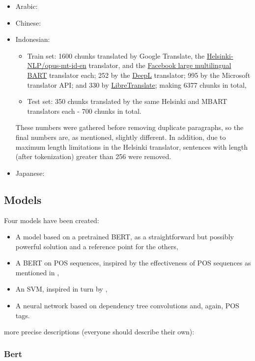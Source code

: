 \documentclass[twocolumn]{article}
\begin{document}
\begin{itemize}
	\item Arabic:
	\item Chinese:
	\item Indonesian:
	\begin{itemize}
		\item Train set: 1600 chunks translated by Google Translate, the \href{https://huggingface.co/Helsinki-NLP/opus-mt-id-en}{Helsinki-NLP/opus-mt-id-en} translator, and the \href{https://huggingface.co/facebook/mbart-large-50-many-to-one-mmt}{Facebook large multilingual BART} translator each; 252 by the \href{https://www.deepl.com/en/translator}{DeepL} translator; 995  by the Microsoft translator API; and 330 by \href{https://libretranslate.com/}{LibreTranslate}; making 6377 chunks in total,
		\item Test set: 350 chunks translated by the same Helsinki and MBART translators each - 700 chunks in total.
	\end{itemize}
	These numbers were gathered before removing duplicate paragraphs, so the final numbers are, as mentioned, slightly different. In addition, due to maximum length limitations in the Helsinki translator, sentences with length (after tokenization) greater than 256 were removed.

	\item Japanese:
\end{itemize}

\subsection*{Models}

Four models have been created:

\begin{itemize}
	\item A model based on a pretrained BERT, as a straightforward but possibly powerful solution and a reference point for the others,
	\item A BERT on POS sequences, inspired by the effectiveness of POS sequences as mentioned in \cite{canada},
	\item An SVM, inspired in turn by \cite{literary},
	\item A neural network based on dependency tree convolutions and, again, POS tags.
\end{itemize}

more precise descriptions (everyone should describe their own):

\subsubsection*{Bert}
\end{document}
